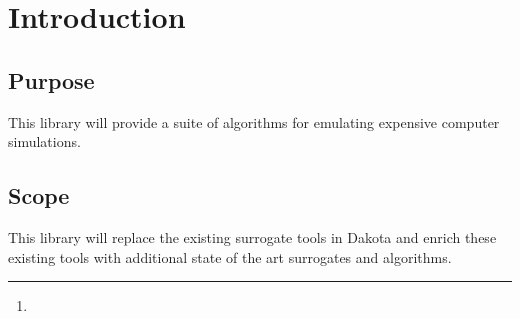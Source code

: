 \documentclass[dakotalogo]{dakota-article}
\title{\mytitle}
\date{March 2017}
\author{B. Adams\thanks{\SNL}, R. Hooper\samethanks[1], \mycorauthor\samethanks[1], A. Rushdi\samethanks[1]}
\begin{document}
\pagestyle{myheader}
\maketitle
\section{Introduction}
\subsection{Purpose}
This library will provide a suite of algorithms for emulating expensive computer simulations.

\subsection{Scope}
This library will replace the existing surrogate tools in Dakota and enrich these existing tools with additional state of the art surrogates and algorithms.
\end{document}
